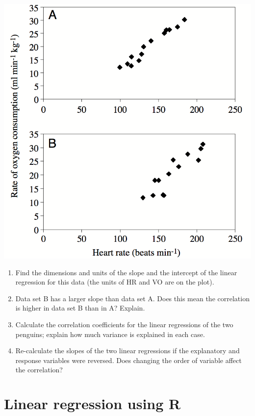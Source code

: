 \documentclass[
  letterpaper,
  DIV=11,
  numbers=noendperiod]{scrreprt}
\begin{document}
\includegraphics{./ch8/penguin_HR.png} \label{fig:ch8_penguins}

\begin{enumerate}
\def\labelenumi{\arabic{enumi}.}
\item
  Find the dimensions and units of the slope and the intercept of the
  linear regression for this data (the units of HR and VO are on the
  plot).
\item
  Data set B has a larger slope than data set A. Does this mean the
  correlation is higher in data set B than in A? Explain.
\item
  Calculate the correlation coefficients for the linear regressions of
  the two penguins; explain how much variance is explained in each case.
\item
  Re-calculate the slopes of the two linear regressions if the
  explanatory and response variables were reversed. Does changing the
  order of variable affect the correlation?
\end{enumerate}

\hypertarget{linear-regression-using-r}{%
\section{Linear regression using R}\label{linear-regression-using-r}}
\end{document}
